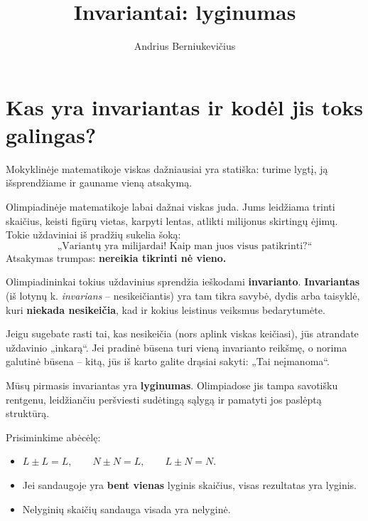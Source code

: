 \documentclass[11pt,a4paper]{scrartcl}
\title{Invariantai: lyginumas}
\author{Andrius Berniukevičius}
\begin{document}
\maketitle

\section{Kas yra invariantas ir kodėl jis toks galingas?}

Mokyklinėje matematikoje viskas dažniausiai yra statiška: turime lygtį, ją išsprendžiame ir gauname vieną atsakymą. 

Olimpiadinėje matematikoje labai dažnai viskas juda. Jums leidžiama trinti skaičius, keisti figūrų vietas, karpyti lentas, atlikti milijonus skirtingų ėjimų. Tokie uždaviniai iš pradžių sukelia šoką:
\[
\text{„Variantų yra milijardai! Kaip man juos visus patikrinti?“}
\]
Atsakymas trumpas: \textbf{nereikia tikrinti nė vieno.}

Olimpiadininkai tokius uždavinius sprendžia ieškodami \textbf{invarianto}. 
\textbf{Invariantas} (iš lotynų k. \textit{invarians} – nesikeičiantis) yra tam tikra savybė, dydis arba taisyklė, kuri \textbf{niekada nesikeičia}, kad ir kokius leistinus veiksmus bedarytumėte.

Jeigu sugebate rasti tai, kas nesikeičia (nors aplink viskas keičiasi), jūs atrandate uždavinio „inkarą“. Jei pradinė būsena turi vieną invarianto reikšmę, o norima galutinė būsena – kitą, jūs iš karto galite drąsiai sakyti: „Tai neįmanoma“.

Mūsų pirmasis invariantas yra \textbf{lyginumas}. Olimpiadose jis tampa savotišku rentgenu, leidžiančiu peršviesti sudėtingą sąlygą ir pamatyti jos paslėptą struktūrą.

Prisiminkime abėcėlę:
\begin{itemize}
    \item $L \pm L = L, \qquad N \pm N = L, \qquad L \pm N = N$.
    \item Jei sandaugoje yra \textbf{bent vienas} lyginis skaičius, visas rezultatas yra lyginis.
    \item Nelyginių skaičių sandauga visada yra nelyginė.
\end{itemize}

\begin{center}
\end{center}
\end{document}
